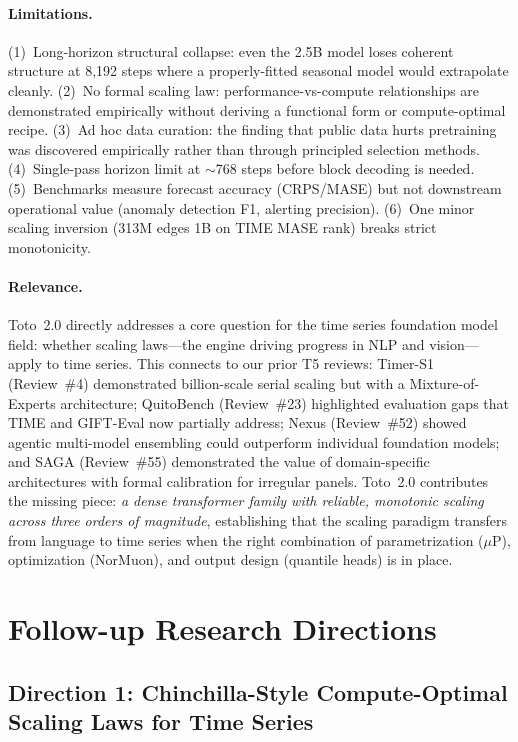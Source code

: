 \documentclass[11pt,a4paper]{article}
\begin{document}
\paragraph{Limitations.}
(1)~Long-horizon structural collapse: even the 2.5B model loses coherent structure at 8,192 steps where a properly-fitted seasonal model would extrapolate cleanly. (2)~No formal scaling law: performance-vs-compute relationships are demonstrated empirically without deriving a functional form or compute-optimal recipe. (3)~Ad hoc data curation: the finding that public data hurts pretraining was discovered empirically rather than through principled selection methods. (4)~Single-pass horizon limit at $\sim$768 steps before block decoding is needed. (5)~Benchmarks measure forecast accuracy (CRPS/MASE) but not downstream operational value (anomaly detection F1, alerting precision). (6)~One minor scaling inversion (313M edges 1B on TIME MASE rank) breaks strict monotonicity.

\paragraph{Relevance.}
Toto~2.0 directly addresses a core question for the time series foundation model field: whether scaling laws---the engine driving progress in NLP and vision---apply to time series. This connects to our prior T5 reviews: Timer-S1 (Review~\#4) demonstrated billion-scale serial scaling but with a Mixture-of-Experts architecture; QuitoBench (Review~\#23) highlighted evaluation gaps that TIME and GIFT-Eval now partially address; Nexus (Review~\#52) showed agentic multi-model ensembling could outperform individual foundation models; and SAGA (Review~\#55) demonstrated the value of domain-specific architectures with formal calibration for irregular panels. Toto~2.0 contributes the missing piece: \emph{a dense transformer family with reliable, monotonic scaling across three orders of magnitude}, establishing that the scaling paradigm transfers from language to time series when the right combination of parametrization ($\mu$P), optimization (NorMuon), and output design (quantile heads) is in place.

\section*{Follow-up Research Directions}

\subsection*{Direction 1: Chinchilla-Style Compute-Optimal Scaling Laws for Time Series}
\end{document}
